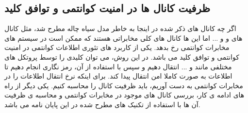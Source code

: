 \subsection{ظرفیت کانال ها در امنیت کوانتمی و توافق کلید}
اگر چه کانال های ذکر شده در اینجا به خاطر مدل سیاه چاله مطرح شد،
مثل کانال های
و
و ...
 اما این ها کانال های کلی مخابراتی هستند که ممکن است در سیستم های مخابرات کوانتمی رخ بدهد. یکی از کاربرد های تئوری اطلاعات کوانتمی در امنیت کوانتمی و توافق کلید می باشد. در این روش، می توان کلیدی را توسط پروتکل های مختلفی مانند
 و ... انتقال دهیم و سپس با استفاده از آن، رمز نگاری 
 انجام دهیم تا اطلاعات به صورت کاملا امن انتقال پیدا کند. برای اینکه نرخ انتقال اطلاعات را در مخابرات کوانتمی به دست آوریم، باید ظرفیت کانال را محاسبه کنیم. یکی دیگر از راه های ادامه ی کار، بررسی کانال های موجود در مخابرات کوانتمی و محاسبه ی ظرفیت آن ها با استفاده از تکنیک های مطرح شده در این پایان نامه می باشد.
